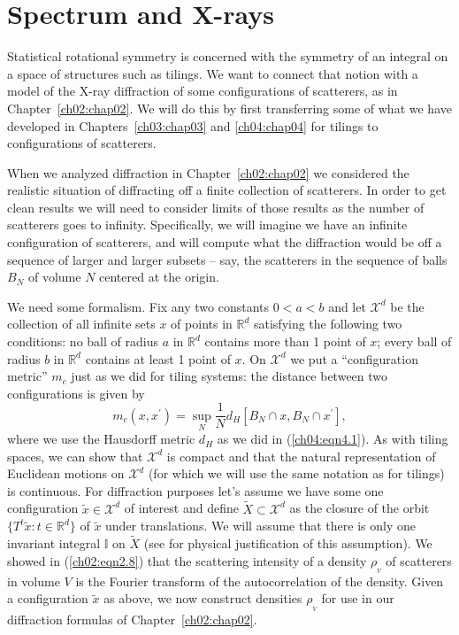\documentclass[reqno]{stml-l}
\theoremstyle{plain}
\theoremstyle{definition}
\numberwithin{equation}{chapter}
\begin{document}
\section{Spectrum and X-rays}\label{ch04:sec2}

Statistical rotational symmetry is concerned with the symmetry of an integral on a space of structures such as tilings. We want to connect that notion with a model of the $\mathrm{X}$-ray diffraction of some configurations of scatterers, as in Chapter~\ref{ch02:chap02}. We will do this by first transferring some of what we have developed in Chapters~\ref{ch03:chap03} and \ref{ch04:chap04} for tilings to configurations of scatterers.

When we analyzed diffraction in Chapter~\ref{ch02:chap02} we considered the realistic situation of diffracting off a finite collection of scatterers. In order to get clean results we will need to consider limits of those results as the number of scatterers goes to infinity. Specifically, we will imagine we have an infinite configuration of scatterers, and will compute what the diffraction would be off a sequence of larger and larger subsets -- say, the scatterers in the sequence of balls $B_{N}$ of volume $N$ centered at the origin.

We need some formalism. Fix any two constants $0<a<b$ and let $\mathcal{X}^{d}$ be the collection of all infinite sets $x$ of points in $\mathbb{R}^{d}$ satisfying the following two conditions: no ball of radius $a$ in $\mathbb{R}^{d}$ contains more than 1 point of $x$; every ball of radius $b$ in $\mathbb{R}^{d}$ contains at least 1 point of $x$. On $\mathcal{X}^{d}$ we put a ``configuration metric'' $m_{c}$ just as we did for tiling systems: the distance between two configurations is given by
\begin{equation}\label{ch04:eqn4.16}
m_{c}(x, x^{\prime})=\sup_{N}\frac{1}{N}d_{H}[B_{N}\cap x, B_{N}\cap x^{\prime}],
\end{equation}
where we use the Hausdorff metric $d_{H}$ as we did in (\ref{ch04:eqn4.1}). As with tiling spaces, we can show that $\mathcal{X}^{d}$ is compact and that the natural representation of Euclidean motions on $\mathcal{X}^{d}$ (for which we will use the same notation as for tilings) is continuous. For diffraction purposes let's assume we have some one configuration $\tilde{x}\in \mathcal{X}^{d}$ of interest and define $\tilde{X}\subset \mathcal{X}^{d}$ as the closure of the orbit $\{T^{t}\tilde{x}:t\in \mathbb{R}^{d}\}$ of $\tilde{x}$ under translations. We will assume that there is only one invariant integral $\mathbb{I}$ on $\tilde{X}$ (see \cite{bib:Ra1} for physical justification of this assumption). We showed in (\ref{ch02:eqn2.8}) that the scattering intensity of a density $\rho_{_{V}}$ of scatterers in volume $V$ is the Fourier transform of the autocorrelation of the density. Given a configuration $\tilde{x}$ as above, we now construct densities $\rho_{_{V}}$ for use in our diffraction formulas of Chapter~\ref{ch02:chap02}.
\end{document}
